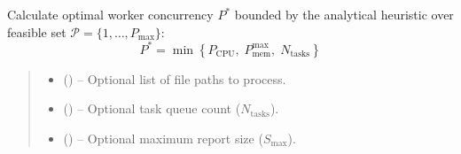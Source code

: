 \documentclass[a4paper,11pt,english,openany,oneside]{sphinxmanual}
\begin{document}
\begin{fulllineitems}
\begin{fulllineitems}
\label{\detokenize{modules/core:core.resource_manager.ResourceManager.get_optimal_workers}}
\pysigstartsignatures
\pysiglinewithargsret
{}
{\sphinxparamcomma {}\sphinxparamcomma {}}
{}
\pysigstopsignatures
\sphinxAtStartPar
Calculate optimal worker concurrency $P^*$ bounded by the analytical heuristic over feasible set $\mathcal{P} = \{1, \dots, P_{\max}\}$:
\begin{equation*}
P^* = \min \left\{ P_{\mathrm{CPU}}, \; P_{\mathrm{mem}}^{\max}, \; N_{\mathrm{tasks}} \right\}
\end{equation*}
\begin{quote}\begin{description}
\begin{itemize}
\item {} 
\sphinxAtStartPar
{} (\sphinxstyleliteralemphasis{\sphinxupquote{{[}}}\sphinxstyleliteralemphasis{\sphinxupquote{{]} }}\sphinxstyleliteralemphasis{\sphinxupquote{| }}) – Optional list of file paths to process.

\item {} 
\sphinxAtStartPar
{} (\sphinxstyleliteralemphasis{\sphinxupquote{ | }}) – Optional task queue count ($N_{\mathrm{tasks}}$).

\item {} 
\sphinxAtStartPar
{} (\sphinxstyleliteralemphasis{\sphinxupquote{ | }}) – Optional maximum report size ($S_{\max}$).


\end{itemize}
\end{description}
\end{quote}
\end{fulllineitems}
\end{fulllineitems}
\end{document}
